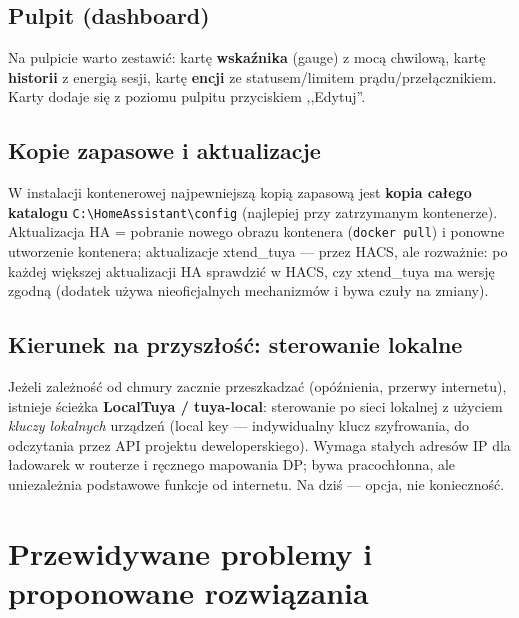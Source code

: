 \documentclass[11pt,a4paper]{article}
\begin{document}
\subsection{Pulpit (dashboard)}

Na pulpicie warto zestawić: kartę \textbf{wskaźnika} (gauge) z mocą chwilową, kartę \textbf{historii} z energią sesji, kartę \textbf{encji} ze statusem/limitem prądu/przełącznikiem. Karty dodaje się z poziomu pulpitu przyciskiem ,,Edytuj''.

\subsection{Kopie zapasowe i aktualizacje}

W instalacji kontenerowej najpewniejszą kopią zapasową jest \textbf{kopia całego katalogu} \texttt{C:\textbackslash HomeAssistant\textbackslash config} (najlepiej przy zatrzymanym kontenerze). Aktualizacja HA = pobranie nowego obrazu kontenera (\texttt{docker pull}) i ponowne utworzenie kontenera; aktualizacje xtend\_tuya --- przez HACS, ale rozważnie: po każdej większej aktualizacji HA sprawdzić w HACS, czy xtend\_tuya ma wersję zgodną (dodatek używa nieoficjalnych mechanizmów i bywa czuły na zmiany).

\subsection{Kierunek na przyszłość: sterowanie lokalne}

Jeżeli zależność od chmury zacznie przeszkadzać (opóźnienia, przerwy internetu), istnieje ścieżka \textbf{LocalTuya / tuya-local}: sterowanie po sieci lokalnej z użyciem \emph{kluczy lokalnych} urządzeń (local key --- indywidualny klucz szyfrowania, do odczytania przez API projektu deweloperskiego). Wymaga stałych adresów IP dla ładowarek w routerze i ręcznego mapowania DP; bywa pracochłonna, ale uniezależnia podstawowe funkcje od internetu. Na dziś --- opcja, nie konieczność.

\section{Przewidywane problemy i proponowane rozwiązania}
\label{sec:problemy}
\end{document}
